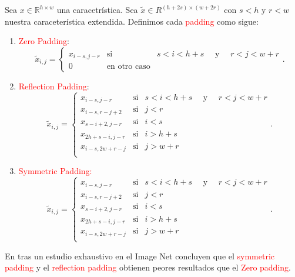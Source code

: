 \begin{definition}
    Sea $x\in \mathbb R^{h\times w}$ una caracetrística. Sea $\tilde x \in R^{(h+2s)\times (w+2r)}$ con $s < h$ y $r < w$ nuestra caraceterística extendida. Definimos cada \textcolor{red}{padding} como sigue:
    \begin{enumerate}
        \item \textcolor{red}{Zero Padding}: 
        \begin{equation}           
            \tilde x_{i,j} = \left\{ 
                \begin{matrix}
                    x_{i-s, j-r} & \text{si} & s< i <h+s \quad \text{ y } \quad r< j < w+r \\
                    0 & \text{en otro caso}
                \end{matrix}
            \right..
        \end{equation}
        \item \textcolor{red}{Reflection Padding}:
        \begin{equation}           
            \tilde x_{i,j} = \left\{ 
                \begin{matrix}
                    x_{i-s, j-r} & \text{si} & s< i <h+s \quad \text{ y } \quad r< j < w+r \\
                    x_{i-s, r-j+2} & \text{si} & j < r \\
                    x_{s-i+2, j-r} & \text{si} & i < s \\
                    x_{2h+s-i, j-r} & \text{si} & i > h+s \\
                    x_{i-s, 2w+r-j} & \text{si} & j > w+r \\
                \end{matrix}
            \right..
        \end{equation}
        \item \textcolor{red}{Symmetric Padding:}
        \begin{equation}           
            \tilde x_{i,j} = \left\{ 
                \begin{matrix}
                    x_{i-s, j-r} & \text{si} & s< i <h+s \quad \text{ y } \quad r< j < w+r \\
                    x_{i-s, r-j+2} & \text{si} & j < r \\
                    x_{s-i+2, j-r} & \text{si} & i < s \\
                    x_{2h+s-i, j-r} & \text{si} & i > h+s \\
                    x_{i-s, 2w+r-j} & \text{si} & j > w+r \\
                \end{matrix}
            \right..
        \end{equation}
    \end{enumerate}  
\end{definition}
En \cite{type_of_paddings} tras un estudio exhaustivo en el Image Net concluyen que el \textcolor{red}{symmetric padding} y el \textcolor{red}{reflection padding} obtienen peores resultados que el \textcolor{red}{Zero padding}. 
